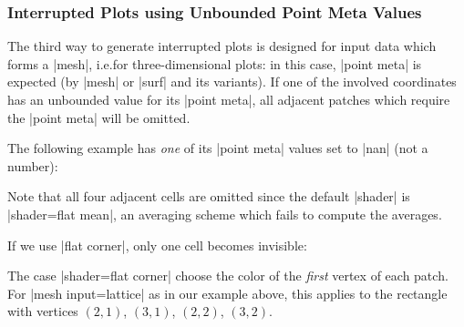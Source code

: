 {\subsubsection{Interrupted Plots using Unbounded Point Meta Values}

The third way to generate interrupted plots is designed for input data which
forms a |mesh|, i.e.\@ for three-dimensional plots: in this case, |point meta|
is expected (by |mesh| or |surf| and its variants). If one of the involved
coordinates has an unbounded value for its |point meta|, all adjacent patches
which require the |point meta| will be omitted.

The following example has \emph{one} of its |point meta| values set to |nan|
(not a number):
%
\begin{codeexample}[]
\end{codeexample}
%
Note that all four adjacent cells are omitted since the default |shader| is
|shader=flat mean|, an averaging scheme which fails to compute the averages.

If we use |flat corner|, only one cell becomes invisible:
%
\begin{codeexample}[]
\end{codeexample}

The case |shader=flat corner| choose the color of the \emph{first} vertex of
each patch. For |mesh input=lattice| as in our example above, this applies to
the rectangle with vertices $(2,1)$, $(3,1)$, $(2,2)$, $(3,2)$.

}
